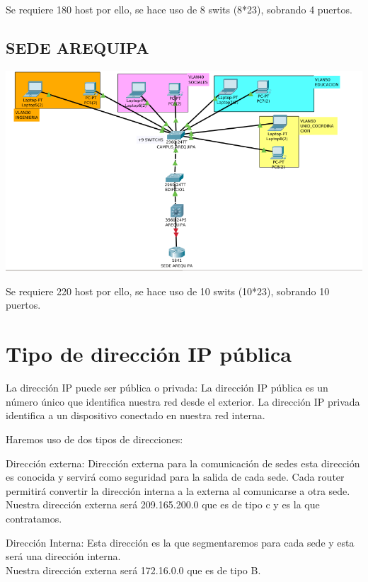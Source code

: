 \begin{definicion}[]
{
Se requiere 180 host por ello, se hace uso de 8 swits (8*23), sobrando 4 puertos.
}
\end{definicion}

\subsection{SEDE AREQUIPA}
\includegraphics[scale=0.6]{img/AREQUIPA.png} 

\begin{definicion}[]
{
Se requiere 220 host por ello, se hace uso de 10 swits (10*23), sobrando 10 puertos.
}
\end{definicion}


\section{Tipo de direcci\'on IP p\'ublica}
\begin{caja}[]
{
La direcci\'on IP puede ser p\'ublica o privada: La direcci\'on IP p\'ublica es un n\'umero \'unico que identifica nuestra red desde el exterior. La direcci\'on IP privada  identifica a un dispositivo conectado en nuestra red interna.
}
\end{caja}
 Haremos uso de dos tipos de direcciones:
\begin{definicion}[]
{
Direcci\'on externa:
	Direcci\'on externa para la comunicaci\'on de sedes esta direcci\'on es conocida y servir\'a como seguridad para la salida de cada sede. Cada router permitir\'a convertir la direcci\'on interna a la externa al comunicarse a otra sede.
 \\
 Nuestra direcci\'on externa ser\'a 209.165.200.0 que es de tipo c y es la que contratamos.
 }
\end{definicion}
\begin{definicion}[]
{
Direcci\'on Interna:
	Esta direcci\'on es la que segmentaremos para cada sede y esta ser\'a una direcci\'on interna.
 \\
 Nuestra direcci\'on externa ser\'a 172.16.0.0 que es de tipo B.
 }
\end{definicion}


